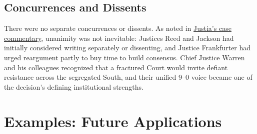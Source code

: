\documentclass[12pt]{article}
\begin{document}
\subsection{Concurrences and Dissents}

There were no separate concurrences or dissents. As noted in \href{https://supreme.justia.com/cases/federal/us/347/483/}{Justia's case commentary}, unanimity was not inevitable: Justices Reed and Jackson had initially considered writing separately or dissenting, and Justice Frankfurter had urged reargument partly to buy time to build consensus. Chief Justice Warren and his colleagues recognized that a fractured Court would invite defiant resistance across the segregated South, and their unified 9--0 voice became one of the decision's defining institutional strengths.

\section{Examples: Future Applications}
\end{document}
